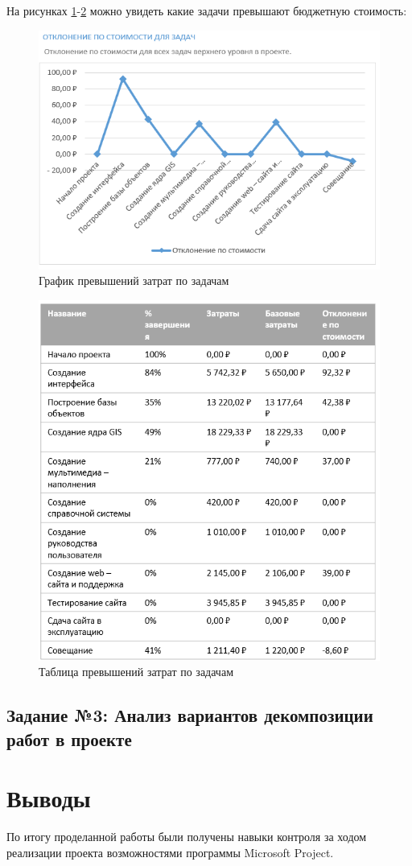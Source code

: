 \newpage
На рисунках \ref{p2}-\ref{p3} можно увидеть какие задачи превышают бюджетную стоимость:
\begin{figure}[!h]
	\centering
	\includegraphics[width=0.7\linewidth]{inc/img/2.png}
	\caption{График превышений затрат по задачам}
	\label{p2}
\end{figure}

\begin{figure}[!h]
	\centering
	\includegraphics[width=0.7\linewidth]{inc/img/3.png}
	\caption{Таблица превышений затрат по задачам}
	\label{p3}
\end{figure}


\newpage
\subsection*{Задание №3: Анализ вариантов декомпозиции работ в проекте}


\section*{Выводы}


По итогу проделанной работы были получены навыки контроля за ходом реализации проекта возможностями программы Microsoft Project.